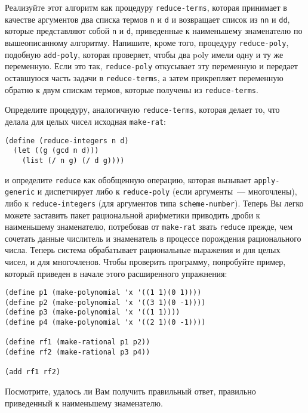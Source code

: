 \begin{exercise}[]{2.97}\label{EX2.97}%
\begin{plainenum}
\item Реализуйте этот алгоритм как процедуру
{\tt reduce-terms}, которая принимает в качестве аргументов два
списка термов {\tt n} и {\tt d} и возвращает список
из {\tt nn} и {\tt dd}, которые представляют собой {\tt n}
и {\tt d}, приведенные к наименьшему знаменателю по
вышеописанному алгоритму.  Напишите, кроме того, процедуру
{\tt reduce-poly}, подобную {\tt add-poly}, которая
проверяет, чтобы два poly имели одну и ту же переменную.  Если это
так, {\tt reduce-poly} откусывает эту переменную и передает
оставшуюся часть задачи в {\tt reduce-terms}, а затем
прикрепляет переменную обратно к двум спискам термов, которые получены
из {\tt reduce-terms}.

\item Определите процедуру, аналогичную
{\tt reduce-terms}, которая делает то, что делала для целых
чисел исходная {\tt make-rat}:

\begin{Verbatim}[fontsize=\small]
(define (reduce-integers n d)
  (let ((g (gcd n d)))
    (list (/ n g) (/ d g))))
\end{Verbatim}
и определите {\tt reduce} как обобщенную операцию, которая
вызывает {\tt apply-generic} и диспетчирует либо к
{\tt reduce-poly} (если аргументы~---  многочлены), либо к
{\tt reduce-in\-te\-gers} (для аргументов типа
{\tt scheme-number}).  Теперь Вы легко можете заставить пакет
рациональной арифметики приводить дроби к наименьшему знаменателю,
потребовав от {\tt make-rat} звать {\tt reduce} прежде,
чем сочетать данные числитель и знаменатель в процессе порождения
рационального числа.  Теперь система обрабатывает рациональные
выражения и для целых чисел, и для многочленов.  Чтобы проверить
программу, попробуйте пример, который приведен в начале этого расширенного
упражнения:

\begin{Verbatim}[fontsize=\small]
(define p1 (make-polynomial 'x '((1 1)(0 1))))
(define p2 (make-polynomial 'x '((3 1)(0 -1))))
(define p3 (make-polynomial 'x '((1 1))))
(define p4 (make-polynomial 'x '((2 1)(0 -1))))

(define rf1 (make-rational p1 p2))
(define rf2 (make-rational p3 p4))

(add rf1 rf2)
\end{Verbatim}
Посмотрите, удалось ли Вам получить правильный ответ, правильно приведенный к
наименьшему знаменателю.
\end{plainenum}
\end{exercise}


